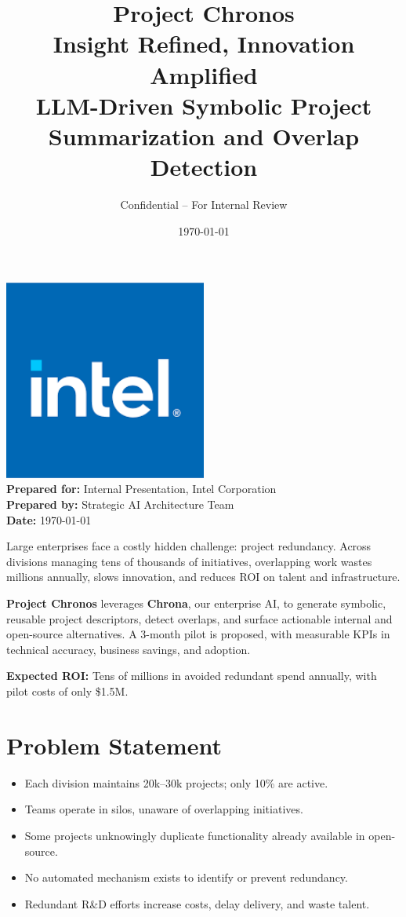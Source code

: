 \documentclass[12pt,a4paper]{article}
\title{\Huge \textbf{Project Chronos}\\
\vspace{0.3cm}
\Large Insight Refined, Innovation Amplified\\
\vspace{0.5cm}
\large LLM-Driven Symbolic Project Summarization and Overlap Detection}
\author{\Large Confidential – For Internal Review}
\date{\today}
\begin{document}
\maketitle
\thispagestyle{empty}
\begin{center}
  \vfill
  \includegraphics[width=0.5\textwidth]{company_logo.png} \\ %
  \vspace{1.5cm}
  \textbf{Prepared for:} Internal Presentation, Intel Corporation \\
  \textbf{Prepared by:} Strategic AI Architecture Team \\
  \textbf{Date:} \today
  \vfill
\end{center}
\clearpage

\begin{summarybox}
  Large enterprises face a costly hidden challenge: project redundancy. Across divisions managing tens of thousands of initiatives, overlapping work wastes millions annually, slows innovation, and reduces ROI on talent and infrastructure.

  \textbf{Project Chronos} leverages \textbf{Chrona}, our enterprise AI, to generate symbolic, reusable project descriptors, detect overlaps, and surface actionable internal and open-source alternatives. A 3-month pilot is proposed, with measurable KPIs in technical accuracy, business savings, and adoption.

  \textbf{Expected ROI:} Tens of millions in avoided redundant spend annually, with pilot costs of only \$1.5M.
\end{summarybox}

\clearpage

\section{Problem Statement}
\begin{itemize}[leftmargin=2em]
    \item Each division maintains 20k--30k projects; only 10\% are active.  
    \item Teams operate in silos, unaware of overlapping initiatives.  
    \item Some projects unknowingly duplicate functionality already available in open-source.
    \item No automated mechanism exists to identify or prevent redundancy.
    \item Redundant R\&D efforts increase costs, delay delivery, and waste talent.
\end{itemize}
\end{document}
